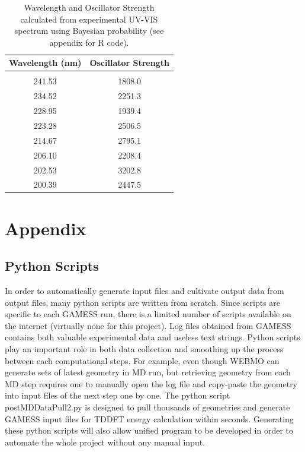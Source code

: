 \documentclass[
journal=jacsat, %
manuscript=article]{achemso}
\begin{document}
\begin{table}[ht]
	\caption{Wavelength and Oscillator Strength calculated from experimental UV-VIS spectrum using Bayesian probability (see appendix for R code).}
	\label{table:anilineUVTable}
	\centering
	\begin{tabular}{c c}
		Wavelength (nm) & Oscillator Strength\\ [1ex] %
		\hline\hline
		\\[-0.5ex]
		241.53&1808.0\\ 
		234.52&2251.3\\
		228.95&1939.4\\
		223.28&2506.5\\ 
		214.67&2795.1\\
		206.10&2208.4\\
		202.53&3202.8\\
		200.39&2447.5\\[1ex]
	\end{tabular}
\end{table}

\clearpage
\appendix 
\label{appendix}
\section*{Appendix}
\renewcommand{\thesubsection}{\Alph{sub}}
	\subsection{Python Scripts}
	In order to automatically generate input files and cultivate output data from output files, many python scripts are written from scratch. Since scripts are specific to each GAMESS run, there is a limited number of scripts available on the internet (virtually none for this project). Log files obtained from GAMESS contains both valuable experimental data and useless text strings. Python scripts play an important role in both data collection and smoothing up the process between each computational steps.  For example, even though WEBMO can generate sets of latest geometry in MD run, but retrieving geometry from each MD step requires one to manually open the log file and copy-paste the geometry into input files of the next step one by one. The python script postMDDataPull2.py is designed to pull thousands of geometries and generate GAMESS input files for TDDFT energy calculation within seconds. Generating these python scripts will also allow unified program to be developed in order to automate the whole project without any manual input.
\end{document}
